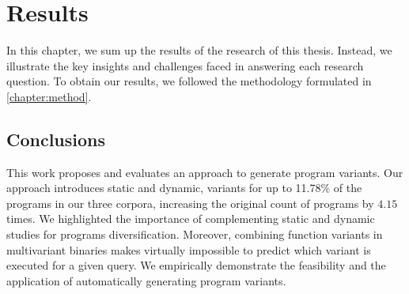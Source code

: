 \chapter{Results} 

In this chapter, we sum up the results of the research of this thesis.  Instead, we illustrate the key insights and challenges faced in answering each research question.  To obtain our results, we followed the methodology formulated in \autoref{chapter:method}.







\pagebreak
\section{Conclusions}

This work proposes and evaluates an approach to generate \wasm program variants. Our approach introduces static and dynamic, variants for up to 11.78\% of the programs in our three corpora, increasing the original count of programs by $4.15$ times. We highlighted the importance of complementing static and dynamic studies for programs diversification. Moreover, combining function variants in multivariant binaries makes virtually impossible to predict which variant is executed for a given query. We empirically demonstrate the feasibility and the application of automatically generating \wasm program variants.

